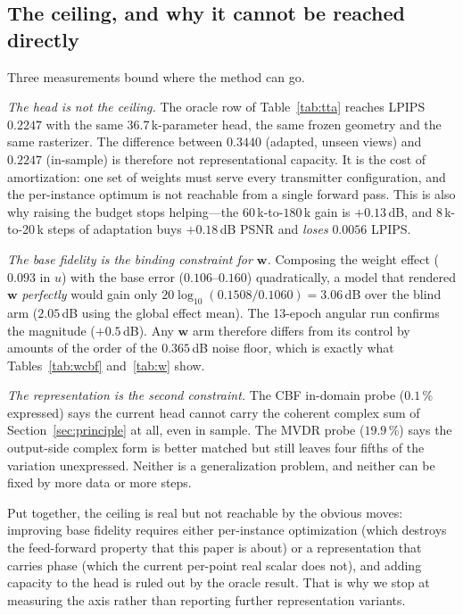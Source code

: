 \documentclass[conference]{IEEEtran}
\begin{document}
\subsection{The ceiling, and why it cannot be reached directly}
\label{sec:ceiling}

Three measurements bound where the method can go.

\emph{The head is not the ceiling.} The oracle row of Table~\ref{tab:tta}
reaches LPIPS $0.2247$ with the same 36.7\,k-parameter head, the same frozen
geometry and the same rasterizer. The difference between $0.3440$ (adapted,
unseen views) and $0.2247$ (in-sample) is therefore not representational
capacity. It is the cost of amortization: one set of weights must serve every
transmitter configuration, and the per-instance optimum is not reachable from a
single forward pass. This is also why raising the budget stops helping---the
$60$\,k-to-$180$\,k gain is $+0.13$\,dB, and 8\,k-to-20\,k steps of adaptation
buys $+0.18$\,dB PSNR and \emph{loses} $0.0056$ LPIPS.

\emph{The base fidelity is the binding constraint for $\mathbf{w}$.} Composing
the weight effect ($0.093$ in $u$) with the base error ($0.106$--$0.160$)
quadratically, a model that rendered $\mathbf{w}$ \emph{perfectly} would gain
only $20\log_{10}(0.1508/0.1060)=3.06$\,dB over the blind arm ($2.05$\,dB using
the global effect mean). The 13-epoch angular run confirms the magnitude
($+0.5$\,dB). Any $\mathbf{w}$ arm therefore differs from its control by
amounts of the order of the $0.365$\,dB noise floor, which is exactly what
Tables~\ref{tab:wcbf} and~\ref{tab:w} show.

\emph{The representation is the second constraint.} The CBF in-domain probe
($0.1\,\%$ expressed) says the current head cannot carry the coherent complex
sum of Section~\ref{sec:principle} at all, even in sample. The MVDR probe
($19.9\,\%$) says the output-side complex form is better matched but still
leaves four fifths of the variation unexpressed. Neither is a generalization
problem, and neither can be fixed by more data or more steps.

Put together, the ceiling is real but not reachable by the obvious moves:
improving base fidelity requires either per-instance optimization (which
destroys the feed-forward property that this paper is about) or a
representation that carries phase (which the current per-point real scalar does
not), and adding capacity to the head is ruled out by the oracle result. That is
why we stop at measuring the axis rather than reporting further representation
variants.
\end{document}
